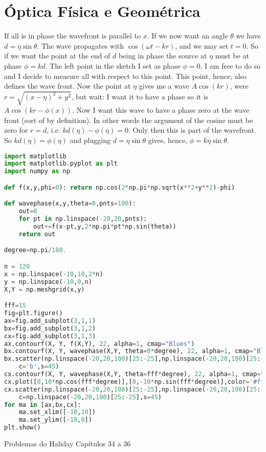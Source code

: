 \chapter{Óptica Física e Geométrica}

If all is in phase the wavefront is parallel to $x$. If we now want an angle $\theta$ we have $d=\eta \sin \theta$. The wave propagates with $\cos (\omega t - k r)$, and we may set $t=0$. So if we want the point at the end of $d$ being in phase the source at $\eta$ must be at phase $\phi = kd$. The left point in the sketch I set as phase $\phi = 0$. I am free to do so and I decide to measure all with respect to this point. This point, hence, also defines the wave front. Now the point at $\eta$ gives me a wave $A\cos(kr)$, were $r=\sqrt{(x - \eta)^2+y^2}$, but wait: I want it to have a phase so it is $A \cos(kr -\phi(x))$. Now I want this wave to have a phase zero at the wave front (sort of by definition). In other words the argument of the cosine must be zero for $r=d$, i.e. $kd(\eta) - \phi(\eta)=0$. Only then this is part of the wavefront. So $kd(\eta)=\phi(\eta)$ and plugging $d=\eta \sin \theta$ gives, hence, $\phi=k\eta \sin \theta$.

\begin{lstlisting}[language=Python, frame=lines,basicstyle=\footnotesize, caption={Princípio de Huygens}, label={lst:Huygens}]
import matplotlib
import matplotlib.pyplot as plt
import numpy as np

def f(x,y,phi=0): return np.cos(2*np.pi*np.sqrt(x**2+y**2)-phi)

def wavephase(x,y,theta=0,pnts=100):
    out=0
    for pt in np.linspace(-20,20,pnts):
        out+=f(x-pt,y,2*np.pi*pt*np.sin(theta))
    return out

degree=np.pi/180.

n = 120
x = np.linspace(-10,10,2*n)
y = np.linspace(-10,0,n)
X,Y = np.meshgrid(x,y)

fff=15
fig=plt.figure()
ax=fig.add_subplot(3,1,1)
bx=fig.add_subplot(3,1,2)
cx=fig.add_subplot(3,1,3)
ax.contourf(X, Y, f(X,Y), 22, alpha=1, cmap="Blues")
bx.contourf(X, Y, wavephase(X,Y, theta=0*degree), 22, alpha=1, cmap="Blues")
bx.scatter(np.linspace(-20,20,100)[25:-25],np.linspace(-20,20,100)[25:-25]*0,
    c='b',s=45)
cx.contourf(X, Y, wavephase(X,Y, theta=fff*degree), 22, alpha=1, cmap="Blues")
cx.plot([0,10*np.cos(fff*degree)],[0,-10*np.sin(fff*degree)],color='#ffaa00')
cx.scatter(np.linspace(-20,20,100)[25:-25],np.linspace(-20,20,100)[25:-25]*0,
    c=np.linspace(-20,20,100)[25:-25],s=45)
for ma in [ax,bx,cx]:
    ma.set_xlim([-10,10])
    ma.set_ylim([-10,0])
plt.show()
\end{lstlisting}

Problemas do Haliday Capítulos 34 a 36
